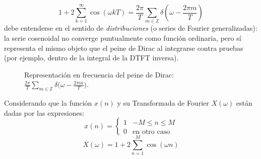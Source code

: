 \documentclass[
  11pt,
  letterpaper,
   addpoints,
   answers
  ]{exam}
\begin{document}
\begin{questions}
\begin{solution}
\[
1+2\sum_{k=1}^{\infty}\cos(\omega kT)
=\frac{2\pi}{T}\sum_{m\in\mathbb{Z}}\delta\!\left(\omega-\frac{2\pi m}{T}\right)
\]
debe entenderse en el sentido de \emph{distribuciones} (o series de Fourier generalizadas): la serie cosenoidal no converge puntualmente como función ordinaria, pero sí representa el mismo objeto que el peine de Dirac al integrarse contra pruebas (por ejemplo, dentro de la integral de la DTFT inversa).
\begin{figure}[H]
\centering
{}
\caption{Representación en frecuencia del peine de Dirac: $\frac{2\pi}{T}\sum_{m\in\mathbb{Z}}\delta\!\big(\omega-\tfrac{2\pi m}{T}\big)$.}
\end{figure}

\end{solution}

\question Considerando que la función $x(n)$ y su Transformada de Fourier $X(\omega)$ están dadas por las expresiones:
\[
x(n) = \begin{cases}
1 & -M \leq n \leq M \\
0 & \text{en otro caso}
\end{cases}
\]
\[
X(\omega) = 1 + 2\sum_{n=1}^{M} \cos(\omega n)
\]


\end{questions}
\end{document}
